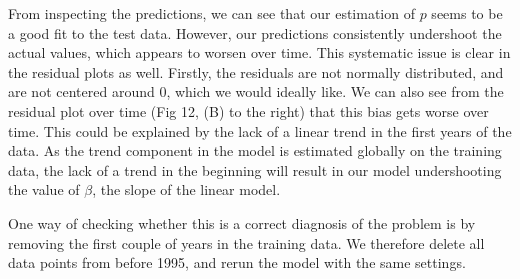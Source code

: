 \documentclass{article}
\begin{document}
\noindent From inspecting the predictions, we can see that our estimation of $p$ seems to be a good fit to the test data. However, our predictions consistently undershoot the actual values, which appears to worsen over time. This systematic issue is clear in the residual plots as well. Firstly, the residuals are not normally distributed, and are not centered around 0, which we would ideally like. We can also see from the residual plot over time (Fig 12, (B) to the right) that this bias gets worse over time. This could be explained by the lack of a linear trend in the first years of the data. As the trend component in the model is estimated globally on the training data, the lack of a trend in the beginning will result in our model undershooting the value of $\beta$, the slope of the linear model. 

\noindent One way of checking whether this is a correct diagnosis of the problem is by removing the first couple of years in the training data. We therefore delete all data points from before 1995, and rerun the model with the same settings.
\end{document}
